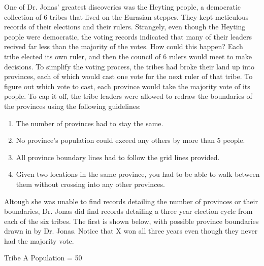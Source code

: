 One of Dr. Jonas' greatest discoveries was the Heyting people, a democratic collection of 6 tribes that lived on the Eurasian steppes.
They kept meticulous records of their elections and their rulers.
Strangely, even though the Heyting people were democratic, the voting records indicated that many of their leaders recived far less than the majority of the votes.
How could this happen?
Each tribe elected its own ruler, and then the council of 6 rulers would meet to make decisions.
To simplify the voting process, the tribes had broke their land up into provinces, each of which would cast one vote for the next ruler of that tribe.
To figure out which vote to cast, each province would take the majority vote of its people.
To cap it off, the tribe leaders were allowed to redraw the boundaries of the provinces using the following guidelines:
\begin{enumerate}
\item The number of provinces had to stay the same.
\item No province's population could exceed any others by more than 5 people.
\item All province boundary lines had to follow the grid lines provided.
\item Given two locations in the same province, you had to be able to walk between them without crossing into any other provinces.
\end{enumerate}

Altough she was unable to find records detailing the number of provinces or their boundaries, Dr. Jonas did find records detailing a three year election cycle from each of the six tribes.
The first is shown below, with possible province boundaries drawn in by Dr. Jonas.
Notice that X won all three years even though they never had the majority vote.

Tribe A
Population = 50

